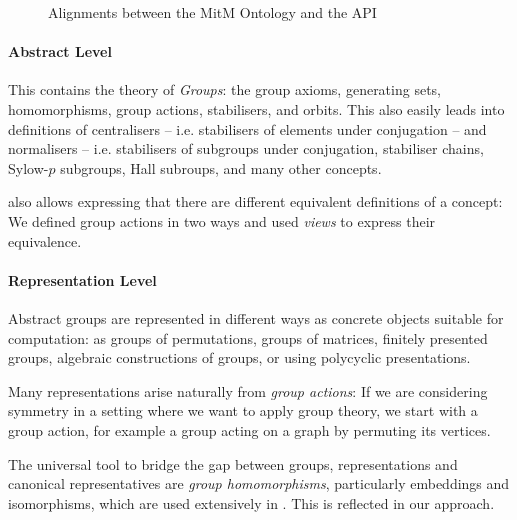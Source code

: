 \begin{figure}[ht]\centering
  \caption{Alignments between the MitM Ontology and the \GAP API}\label{fig:cgtontology}
\end{figure}

\paragraph{Abstract Level} This contains the theory of \emph{Groups}: the group
axioms, generating sets, homomorphisms, group actions, stabilisers, and orbits.
This also easily leads into definitions of centralisers -- i.e. stabilisers of
elements under conjugation -- and normalisers -- i.e. stabilisers of subgroups
under conjugation, stabiliser chains, Sylow-$p$ subgroups, Hall subroups, and
many other concepts.

\OMMT also allows expressing that there are different equivalent definitions of
a concept: We defined group actions in two ways and used \emph{views} to express
their equivalence.

\paragraph{Representation Level} 
Abstract groups are represented in different ways as concrete objects
suitable for computation: as groups of permutations, groups of matrices,
finitely presented groups, algebraic constructions of groups, or using
polycyclic presentations.


Many representations arise naturally from \emph{group actions}: If we are
considering symmetry in a setting where we want to apply group theory, we start
with a group action, for example a group acting on a graph by permuting its
vertices.


The universal tool to bridge the gap between groups, representations and
canonical representatives are \emph{group homomorphisms}, particularly
embeddings and isomorphisms, which are used extensively in \GAP. This is
reflected in our approach.

